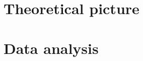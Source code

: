\documentclass[a4paper,twoside]{book}
\begin{document}
     


\chapter{Theoretical picture}


\chapter{Data analysis}



\end{document}
